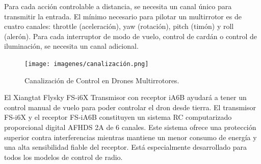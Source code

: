 \noindent Para cada acción controlable a distancia, se necesita un canal único para transmitir la entrada. El mínimo necesario para pilotar un multirrotor es de cuatro canales: throttle (aceleración), yaw (rotación), pitch (timón) y roll (alerón). Para cada interruptor de modo de vuelo, control de cardán o control de iluminación, se necesita un canal adicional.
\begin{figure}[H]
    \centering
    \texttt{[image: imagenes/canalización.png]}
    \caption{Canalización de Control en Drones Multirrotores.}
    \label{fig:nrf}
\end{figure}

\noindent El Xiangtat Flysky FS-i6X Transmisor con receptor iA6B ayudará a tener un control manual de vuelo para poder controlar el dron desde tierra. El transmisor FS-i6X y el receptor FS-iA6B constituyen un sistema RC computarizado proporcional digital AFHDS 2A de 6 canales. Este sistema ofrece una protección superior contra interferencias mientras mantiene un menor consumo de energía y una alta sensibilidad fiable del receptor. Está especialmente desarrollado para todos los modelos de control de radio. \cite{FLYSKY}

